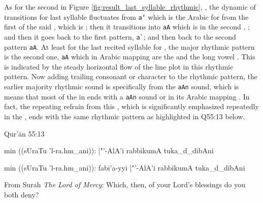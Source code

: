 As for the second   in Figure \ref{fig:result_last_syllable_rhythmic},  , the dynamic of transitions for last syllable fluctuates from \texttt{a`} which is the Arabic for  from the first   of the said  , which is  ; then it transitions into \verb|aA| which is in the second  ,  ; and then it goes back to the first pattern, \verb|a`|; and then back to the second pattern \verb|aA|. At least for the last recited syllable for  , the major rhythmic pattern is the second one, \verb|aA| which in Arabic mapping are the   and the long vowel  . This is indicated by the steady horizontal flow of the line plot in this rhythmic pattern. Now adding trailing consonant or character to the rhythmic pattern, the earlier majority rhythmic sound is specifically from the \verb|aAn| sound, which is means that most of the   in   ends with a \verb|aAn| sound or in its Arabic mapping  . In fact, the repeating refrain from this  , which is significantly emphasized repeatedly in the  , ends with the same rhythmic pattern as highlighted in Q55:13 below.

\begin{bottomtitledframe}{Qur'\=an 55:13}
    \begin{center}
        \begin{arab}
            min ((sUraTu 'l-ra.hm_ani)):  |"'-AlA'i rabbikumA tuka_d_dibAni
        \end{arab}
        \begin{arab}[trans]
            min ((sUraTu 'l-ra.hm_ani)): fabi'a-yyi |"'-AlA'i rabbikumA tuka_d_dibAni
        \end{arab}
    \end{center}
    From Surah \textit{The Lord of Mercy}: Which, then, of your Lord’s blessings do you both deny?
\end{bottomtitledframe}

